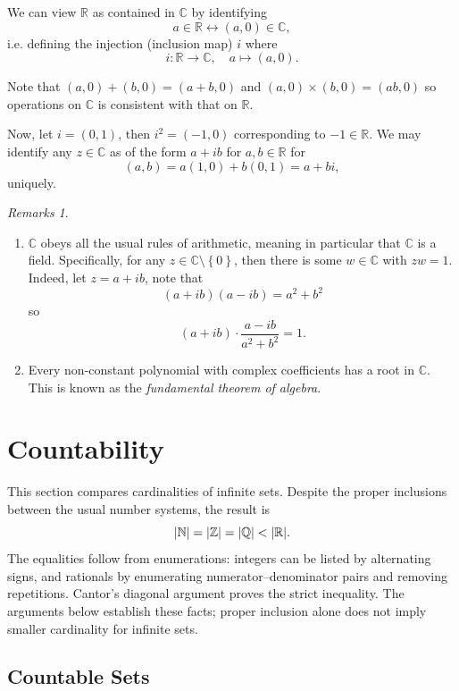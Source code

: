 \documentclass{article}
\theoremstyle{definition}
\theoremstyle{remark}
\newtheorem{remarks}[theorem]{Remarks}
\DeclarePairedDelimiter{\abs}{\lvert}{\rvert}
\newcommand{\pqty}[1]{\left(#1\right)}
\newcommand{\Bqty}[1]{\left\{#1\right\}}
\newcommand{\function}[5]{#1:#2\to #3,\quad #4\mapsto #5}
\newcommand{\NN}{\mathbb{N}}
\newcommand{\ZZ}{\mathbb{Z}}
\newcommand{\QQ}{\mathbb{Q}}
\newcommand{\RR}{\mathbb{R}}
\newcommand{\CC}{\mathbb{C}}
\begin{document}
We can view \(\RR\) as contained in \(\CC\) by identifying
\[
    a \in \RR \leftrightarrow \pqty{a, 0} \in \CC,
\]
i.e. defining the injection (inclusion map) \(i\) where
\[
    \function{i}{\RR}{\CC}{a}{\pqty{a, 0}}.  
\]

Note that \(\pqty{a, 0} + \pqty{b, 0} = \pqty{a + b, 0}\) and \(\pqty{a, 0} \times \pqty{b, 0} = \pqty{ab, 0}\) so operations on \(\CC\) is consistent with that on \(\RR\).

Now, let \(i = \pqty{0, 1}\), then \(i^2 = \pqty{-1, 0}\) corresponding to \(-1 \in \RR\). We may identify any \(z \in \CC\) as of the form \(a + ib\) for \(a, b \in \RR\) for
\[
    \pqty{a, b} = a \pqty{1, 0} + b \pqty{0, 1} = a + bi,
\]
uniquely.

\begin{remarks}
    \begin{enumerate}
        \item \(\CC\) obeys all the usual rules of arithmetic, meaning in particular that \(\CC\) is a field. Specifically, for any \(z \in \CC \setminus \Bqty{0}\), then there is some \(w \in \CC\) with \(zw = 1\). Indeed, let \(z = a + ib\), note that
        \[
            \pqty{a + ib} \pqty{a - ib} = a^2 + b^2
        \]
        so
        \[
            \pqty{a + ib} \cdot \frac{a - ib}{a^2 + b^2} = 1.
        \]

        \item Every non-constant polynomial with complex coefficients has a root in \(\CC\). This is known as the \emph{fundamental theorem of algebra}.
    \end{enumerate}
\end{remarks}

\section{Countability}
\label{sec:countability}

This section compares cardinalities of infinite sets. Despite the proper inclusions between the usual number systems, the result is
\[
\abs{\NN}=\abs{\ZZ}=\abs{\QQ}<\abs{\RR}.
\]
The equalities follow from enumerations: integers can be listed by alternating signs, and rationals by enumerating numerator--denominator pairs and removing repetitions. Cantor's diagonal argument proves the strict inequality. The arguments below establish these facts; proper inclusion alone does not imply smaller cardinality for infinite sets.

\subsection{Countable Sets}
\label{sec:countable-sets}
\end{document}
